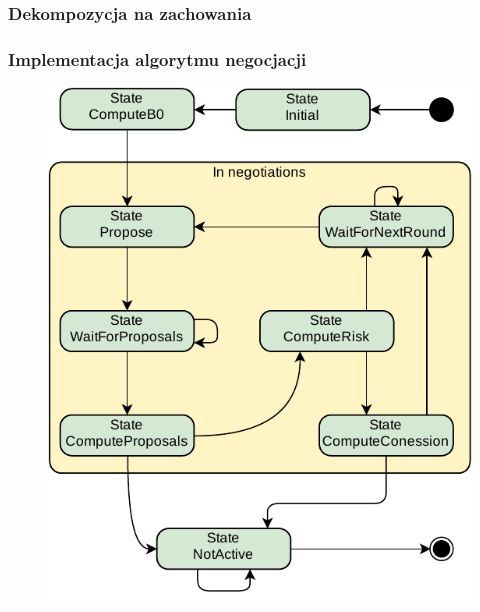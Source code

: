 \documentclass{beamer}
\begin{document}
\begin{frame}
    \frametitle{Dekompozycja na zachowania}
    \begin{figure}[!ht]
    \end{figure}
\end{frame}

\begin{frame}
    \frametitle{Implementacja algorytmu negocjacji}
    \begin{figure}
        \centering
        \includegraphics[width=0.53\columnwidth]{figures/SAG-FactoryFSM.pdf}
        \label{fig:factory-fsm}
    \end{figure}
\end{frame}
\end{document}
